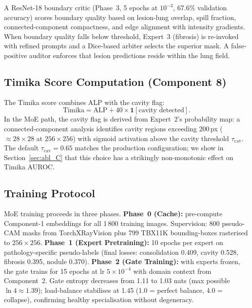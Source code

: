 \documentclass{article}
\begin{document}
A ResNet-18 \cite{he2016resnet} boundary critic (Phase~3, 5 epochs at $10^{-3}$, 67.6\% validation accuracy) scores boundary quality based on lesion-lung overlap, spill fraction, connected-component compactness, and edge alignment with intensity gradients. When boundary quality falls below threshold, Expert~3 (fibrosis) is re-invoked with refined prompts and a Dice-based arbiter selects the superior mask. A false-positive auditor enforces that lesion predictions reside within the lung field.

\subsection{Timika Score Computation (Component 8)}

The Timika score combines ALP with the cavity flag:
\begin{equation}
\text{Timika} = \text{ALP} + 40 \times \mathbf{1}[\text{cavity detected}].
\label{eq:timika}
\end{equation}
In the MoE path, the cavity flag is derived from Expert~2's probability map: a connected-component analysis identifies cavity regions exceeding 200\,px ($\approx 28{\times}28$ at $256{\times}256$) with sigmoid activation above the cavity threshold $\tau_{\text{cav}}$. The default $\tau_{\text{cav}} = 0.65$ matches the production configuration; we show in Section~\ref{sec:abl_C} that this choice has a strikingly non-monotonic effect on Timika AUROC.

\subsection{Training Protocol}

MoE training proceeds in three phases. \textbf{Phase~0 (Cache):} pre-compute Component-1 embeddings for all 1\,800 training images. Supervision: 800 pseudo-CAM masks from TorchXRayVision plus 799 TBX11K bounding-boxes rasterised to $256{\times}256$. \textbf{Phase~1 (Expert Pretraining):} 10 epochs per expert on pathology-specific pseudo-labels (final losses: consolidation 0.409, cavity 0.528, fibrosis 0.395, nodule 0.370). \textbf{Phase~2 (Gate Training):} with experts frozen, the gate trains for 15 epochs at lr $5{\times}10^{-4}$ with domain context from Component~2. Gate entropy decreases from 1.11 to 1.03 nats (max possible $\ln 4 \approx 1.39$); load-balance stabilises at 1.45 (1.0 = perfect balance, 4.0 = collapse), confirming healthy specialisation without degeneracy.
\end{document}
